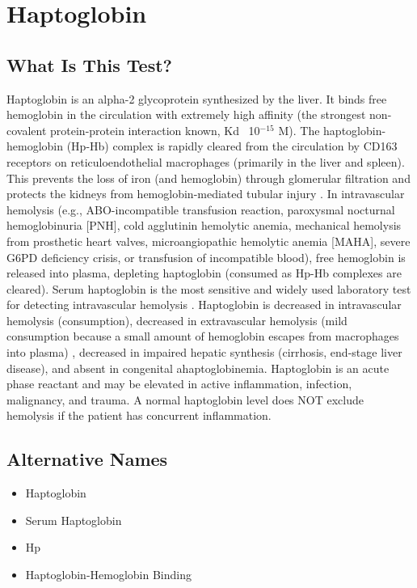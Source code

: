 \chapter{Haptoglobin}
\section*{What Is This Test?}
Haptoglobin is an alpha-2 glycoprotein synthesized by the liver. It binds free hemoglobin in the circulation with extremely high affinity (the strongest non-covalent protein-protein interaction known, Kd ~10$^{-15}$ M). The haptoglobin-hemoglobin (Hp-Hb) complex is rapidly cleared from the circulation by CD163 receptors on reticuloendothelial macrophages (primarily in the liver and spleen). This prevents the loss of iron (and hemoglobin) through glomerular filtration and protects the kidneys from hemoglobin-mediated tubular injury \cite{rother2005clinical}. In intravascular hemolysis (e.g., ABO-incompatible transfusion reaction, paroxysmal nocturnal hemoglobinuria [PNH], cold agglutinin hemolytic anemia, mechanical hemolysis from prosthetic heart valves, microangiopathic hemolytic anemia [MAHA], severe G6PD deficiency crisis, or transfusion of incompatible blood), free hemoglobin is released into plasma, depleting haptoglobin (consumed as Hp-Hb complexes are cleared). Serum haptoglobin is the most sensitive and widely used laboratory test for detecting intravascular hemolysis \cite{barcellini2021clinical}. Haptoglobin is decreased in intravascular hemolysis (consumption), decreased in extravascular hemolysis (mild consumption because a small amount of hemoglobin escapes from macrophages into plasma) \cite{packman2019hemolytic}, decreased in impaired hepatic synthesis (cirrhosis, end-stage liver disease), and absent in congenital ahaptoglobinemia. Haptoglobin is an acute phase reactant and may be elevated in active inflammation, infection, malignancy, and trauma. A normal haptoglobin level does NOT exclude hemolysis if the patient has concurrent inflammation.
\section*{Alternative Names}
\begin{itemize}
  \item Haptoglobin
  \item Serum Haptoglobin
  \item Hp
  \item Haptoglobin-Hemoglobin Binding
\end{itemize}
